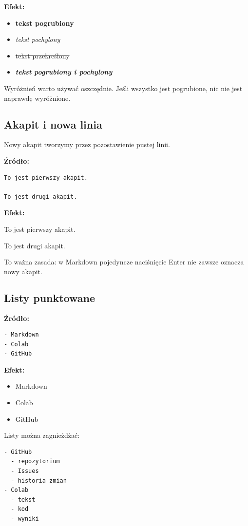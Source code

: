 \documentclass[11pt, a4paper]{article}
\begin{document}
\textbf{Efekt:}
\begin{itemize}[label={}, leftmargin=0pt]
    \item \textbf{tekst pogrubiony}
    \item \textit{tekst pochylony}
    \item \sout{tekst przekreślony}
    \item \textbf{\textit{tekst pogrubiony i pochylony}}
\end{itemize}

Wyróżnień warto używać oszczędnie. Jeśli wszystko jest pogrubione, nic nie jest naprawdę wyróżnione.

\hrulefill

\subsection{Akapit i nowa linia}
Nowy akapit tworzymy przez pozostawienie pustej linii.

\textbf{Źródło:}
\begin{lstlisting}
To jest pierwszy akapit.

To jest drugi akapit.
\end{lstlisting}

\textbf{Efekt:}

To jest pierwszy akapit.

To jest drugi akapit.

To ważna zasada: w Markdown pojedyncze naciśnięcie Enter nie zawsze oznacza nowy akapit.

\hrulefill

\subsection{Listy punktowane}
\textbf{Źródło:}
\begin{lstlisting}
- Markdown
- Colab
- GitHub
\end{lstlisting}

\textbf{Efekt:}
\begin{itemize}
    \item Markdown
    \item Colab
    \item GitHub
\end{itemize}

Listy można zagnieżdżać:
\begin{lstlisting}
- GitHub
  - repozytorium
  - Issues
  - historia zmian
- Colab
  - tekst
  - kod
  - wyniki
\end{lstlisting}
\end{document}
